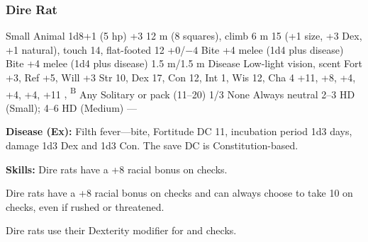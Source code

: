 \subsubsection{Dire Rat}
\begin{MonsterStats}
{Small Animal}
{1d8+1 (5 hp)}
{+3}
{12 m (8 squares), climb 6 m}
{15 (+1 size, +3 Dex, +1 natural), touch 14, flat-footed 12}
{+0/$-4$}
{Bite +4 melee (1d4 plus disease)}
{Bite +4 melee (1d4 plus disease)}
{1.5 m/1.5 m}
{Disease}
{Low-light vision, scent}
{Fort +3, Ref +5, Will +3}
{Str 10, Dex 17, Con 12, Int 1, Wis 12, Cha 4}
{ +11,  +8,  +4,  +4,  +4,  +11}
{, \textsuperscript{B}}
{Any}
{Solitary or pack (11--20)}
{1/3}
{None}
{Always neutral}
{2--3 HD (Small); 4--6 HD (Medium)}
{---}
\end{MonsterStats}

\textbf{Disease (Ex):} Filth fever---bite, Fortitude DC 11, incubation period 1d3 days, damage 1d3 Dex and 1d3 Con. The save DC is Constitution-based.

\textbf{Skills:} Dire rats have a +8 racial bonus on  checks.

Dire rats have a +8 racial bonus on  checks and can always choose to take 10 on  checks, even if rushed or threatened.

Dire rats use their Dexterity modifier for  and  checks.
